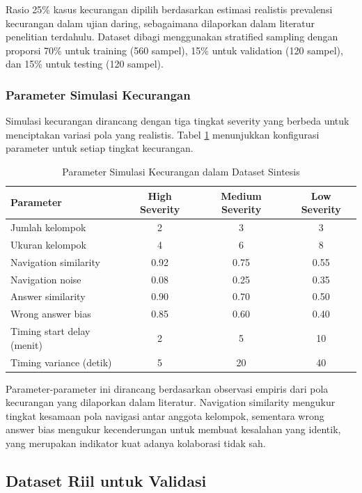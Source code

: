 Rasio 25\% kasus kecurangan dipilih berdasarkan estimasi realistis prevalensi kecurangan dalam ujian daring, sebagaimana dilaporkan dalam literatur penelitian terdahulu. Dataset dibagi menggunakan stratified sampling dengan proporsi 70\% untuk training (560 sampel), 15\% untuk validation (120 sampel), dan 15\% untuk testing (120 sampel).

\subsubsection{Parameter Simulasi Kecurangan}

Simulasi kecurangan dirancang dengan tiga tingkat severity yang berbeda untuk menciptakan variasi pola yang realistis. Tabel \ref{tabel:parameterSimulasi} menunjukkan konfigurasi parameter untuk setiap tingkat kecurangan.

\begin{table}[htbp]
\centering
\caption{Parameter Simulasi Kecurangan dalam Dataset Sintesis}
\label{tabel:parameterSimulasi}
\begin{tabular}{|l|c|c|c|}
\hline
\textbf{Parameter} & \textbf{High Severity} & \textbf{Medium Severity} & \textbf{Low Severity} \\
\hline
Jumlah kelompok & 2 & 3 & 3 \\
\hline
Ukuran kelompok & 4 & 6 & 8 \\
\hline
Navigation similarity & 0.92 & 0.75 & 0.55 \\
\hline
Navigation noise & 0.08 & 0.25 & 0.35 \\
\hline
Answer similarity & 0.90 & 0.70 & 0.50 \\
\hline
Wrong answer bias & 0.85 & 0.60 & 0.40 \\
\hline
Timing start delay (menit) & 2 & 5 & 10 \\
\hline
Timing variance (detik) & 5 & 20 & 40 \\
\hline
\end{tabular}
\end{table}

Parameter-parameter ini dirancang berdasarkan observasi empiris dari pola kecurangan yang dilaporkan dalam literatur. Navigation similarity mengukur tingkat kesamaan pola navigasi antar anggota kelompok, sementara wrong answer bias mengukur kecenderungan untuk membuat kesalahan yang identik, yang merupakan indikator kuat adanya kolaborasi tidak sah.

\subsection{Dataset Riil untuk Validasi}
\label{subsec:datasetRiil}

